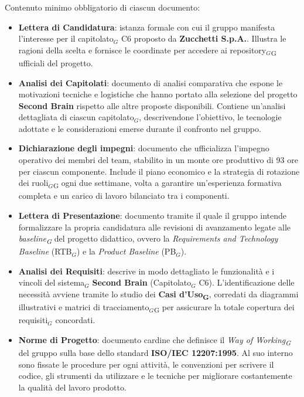 \documentclass[a4paper, 10pt]{article}
\begin{document}
\noindent Contenuto minimo obbligatorio di ciascun documento:
\begin{itemize}
    \item \textbf{Lettera di Candidatura}: istanza formale con cui il gruppo manifesta l'interesse per il capitolato$_G$ C6 proposto da \textbf{Zucchetti S.p.A.}. Illustra le ragioni della scelta e fornisce le coordinate per accedere ai repository$_G$\textsubscript{G} ufficiali del progetto.

    \item \textbf{Analisi dei Capitolati}: documento di analisi comparativa che espone le motivazioni tecniche e logistiche che hanno portato alla selezione del progetto \textbf{Second Brain} rispetto alle altre proposte disponibili. Contiene un'analisi dettagliata di ciascun capitolato$_G$, descrivendone l'obiettivo, le tecnologie adottate e le considerazioni emerse durante il confronto nel gruppo.

    \item \textbf{Dichiarazione degli impegni}: documento che ufficializza l'impegno operativo dei membri del team, stabilito in un monte ore produttivo di 93 ore per ciascun componente. Include il piano economico e la strategia di rotazione dei ruoli$_G$\textsubscript{G} ogni due settimane, volta a garantire un'esperienza formativa completa e un carico di lavoro bilanciato tra i componenti.

    \item \textbf{Lettera di Presentazione}: documento tramite il quale il gruppo intende formalizzare la propria candidatura alle revisioni di avanzamento legate alle \textit{baseline\textsubscript{G}} del progetto didattico, ovvero la \textit{Requirements and Technology Baseline} (RTB$_G$) e la \textit{Product Baseline} (PB$_G$).

    \item \textbf{Analisi dei Requisiti}: descrive in modo dettagliato le funzionalità e i vincoli del sistema$_G$ \textbf{Second Brain} (Capitolato$_G$ C6). L'identificazione delle necessità avviene tramite lo studio dei \textbf{Casi d'Uso\textsubscript{G}}, corredati da diagrammi illustrativi e matrici di tracciamento$_G$\textsubscript{G} per assicurare la totale copertura dei requisiti$_G$ concordati.
    
    \item \textbf{Norme di Progetto}: documento cardine che definisce il \textit{Way of Working\textsubscript{G}} del gruppo sulla base dello standard \textbf{ISO/IEC 12207:1995}. Al suo interno sono fissate le procedure per ogni attività, le convenzioni per scrivere il codice, gli strumenti da utilizzare e le tecniche per migliorare costantemente la qualità del lavoro prodotto.


\end{itemize}
\end{document}
